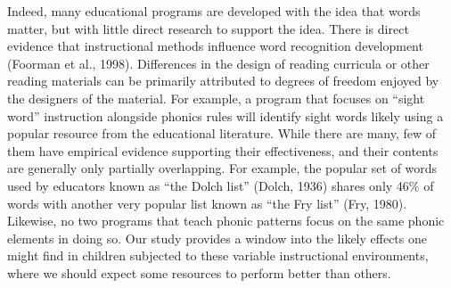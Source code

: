 \documentclass[
  ,man,floatsintext]{apa6}
\begin{document}
Indeed, many educational programs are developed with the idea that words matter, but with little direct research to support the idea. There is direct evidence that instructional methods influence word recognition development (Foorman et al., 1998). Differences in the design of reading curricula or other reading materials can be primarily attributed to degrees of freedom enjoyed by the designers of the material. For example, a program that focuses on ``sight word'' instruction alongside phonics rules will identify sight words likely using a popular resource from the educational literature. While there are many, few of them have empirical evidence supporting their effectiveness, and their contents are generally only partially overlapping. For example, the popular set of words used by educators known as ``the Dolch list'' (Dolch, 1936) shares only 46\% of words with another very popular list known as ``the Fry list'' (Fry, 1980). Likewise, no two programs that teach phonic patterns focus on the same phonic elements in doing so. Our study provides a window into the likely effects one might find in children subjected to these variable instructional environments, where we should expect some resources to perform better than others.
\end{document}
